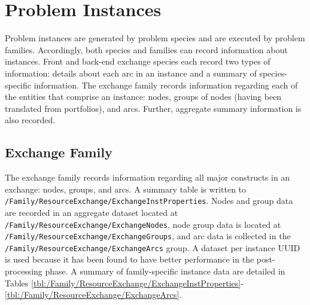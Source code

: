 \section{Problem Instances}

Problem instances are generated by problem species and are executed by problem
families. Accordingly, both species and families can record information about
instances. Front and back-end exchange species each record two types of
information: details about each arc in an instance and a summary of
species-specific information. The exchange family records information regarding
each of the entities that comprise an instance: nodes, groups of nodes (having
been translated from portfolios), and arcs. Further, aggregate summary
information is also recorded. 

\subsection{Exchange Family}

The exchange family records information regarding all major constructs in an
exchange: nodes, groups, and arcs. A summary table is written to
\texttt{/Family/ResourceExchange/ExchangeInstProperties}. Nodes and group data
are recorded in an aggregate dataset located at
\texttt{/Family/ResourceExchange/ExchangeNodes}, node group data is located at
\texttt{/Family/ResourceExchange/ExchangeGroups}, and arc data is collected in
the \texttt{/Family/ResourceExchange/ExchangeArcs} group. A dataset per instance
UUID is used because it has been found to have better performance in the
post-processing phase. A summary of family-specific instance data are detailed in
Tables
\ref{tbl:/Family/ResourceExchange/ExchangeInstProperties}-\ref{tbl:/Family/ResourceExchange/ExchangeArcs}.

